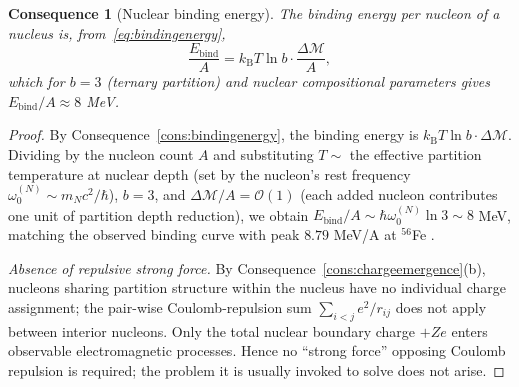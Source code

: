 \documentclass[11pt,twocolumn,a4paper]{article}
\theoremstyle{axiomstyle}
\theoremstyle{conseqstyle}
\newtheorem{consequence}{Consequence}
\theoremstyle{definition}
\theoremstyle{remark}
\newcommand{\kB}{k_{\mathrm{B}}}
\newcommand{\Depth}{\mathcal{M}}
\begin{document}
\begin{consequence}[Nuclear binding energy]
\label{cons:nuclearbinding}
The binding energy per nucleon of a nucleus is, from~\eqref{eq:bindingenergy},
\begin{equation}
\frac{E_{\mathrm{bind}}}{A}=\kB T\ln b\cdot\frac{\Delta\Depth}{A},
\label{eq:nuclearbinding}
\end{equation}
which for $b=3$ (ternary partition) and nuclear compositional parameters gives $E_{\mathrm{bind}}/A\approx 8$ MeV.
\end{consequence}

\begin{proof}
By Consequence~\ref{cons:bindingenergy}, the binding energy is $\kB T\ln b\cdot\Delta\Depth$. Dividing by the nucleon count $A$ and substituting $T\sim$ the effective partition temperature at nuclear depth (set by the nucleon's rest frequency $\omega_{0}^{(N)}\sim m_{N}c^{2}/\hbar$), $b=3$, and $\Delta\Depth/A=\mathcal{O}(1)$ (each added nucleon contributes one unit of partition depth reduction), we obtain $E_{\mathrm{bind}}/A\sim\hbar\omega_{0}^{(N)}\ln 3\sim 8$ MeV, matching the observed binding curve with peak $8.79$ MeV/A at $^{56}$Fe \citep{audi2017,krane1988}.

\emph{Absence of repulsive strong force.} By Consequence~\ref{cons:chargeemergence}(b), nucleons sharing partition structure within the nucleus have no individual charge assignment; the pair-wise Coulomb-repulsion sum $\sum_{i<j}e^{2}/r_{ij}$ does not apply between interior nucleons. Only the total nuclear boundary charge $+Ze$ enters observable electromagnetic processes. Hence no ``strong force'' opposing Coulomb repulsion is required; the problem it is usually invoked to solve does not arise.
\end{proof}
\end{document}
